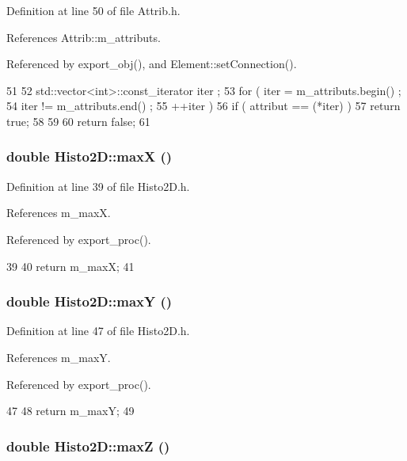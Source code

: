 Definition at line 50 of file Attrib.h.

References Attrib::m\_\-attributs.

Referenced by export\_\-obj(), and Element::setConnection().


\begin{DoxyCode}
51   {
52     std::vector<int>::const_iterator iter ;
53     for ( iter  = m_attributs.begin() ;
54           iter != m_attributs.end()   ;
55           ++iter ) {
56       if ( attribut == (*iter) ) {
57         return true;
58       }
59     }
60     return false;
61   }
\end{DoxyCode}
\hypertarget{classHisto2D_aae04c13ac492562532b4d3f82979a0f4}{
\subsubsection[{maxX}]{\setlength{\rightskip}{0pt plus 5cm}double Histo2D::maxX ()}}
\label{classHisto2D_aae04c13ac492562532b4d3f82979a0f4}


Definition at line 39 of file Histo2D.h.

References m\_\-maxX.

Referenced by export\_\-proc().


\begin{DoxyCode}
39                {
40     return m_maxX;
41   }
\end{DoxyCode}
\hypertarget{classHisto2D_a7bfc748b81257716316a38e628c5832f}{
\subsubsection[{maxY}]{\setlength{\rightskip}{0pt plus 5cm}double Histo2D::maxY ()}}
\label{classHisto2D_a7bfc748b81257716316a38e628c5832f}


Definition at line 47 of file Histo2D.h.

References m\_\-maxY.

Referenced by export\_\-proc().


\begin{DoxyCode}
47                {
48     return m_maxY;
49   }
\end{DoxyCode}
\hypertarget{classHisto2D_ad6ccf8ddd4e4b5930f39284059577570}{
\subsubsection[{maxZ}]{\setlength{\rightskip}{0pt plus 5cm}double Histo2D::maxZ ()}}
\label{classHisto2D_ad6ccf8ddd4e4b5930f39284059577570}


